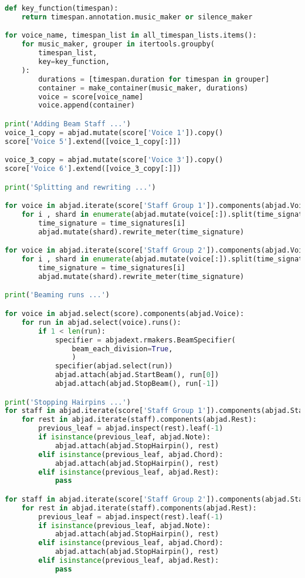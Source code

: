 \begin{lstlisting}[language=Python, caption=Cthar Segment\_I]
def key_function(timespan):
    return timespan.annotation.music_maker or silence_maker

for voice_name, timespan_list in all_timespan_lists.items():
    for music_maker, grouper in itertools.groupby(
        timespan_list,
        key=key_function,
    ):
        durations = [timespan.duration for timespan in grouper]
        container = make_container(music_maker, durations)
        voice = score[voice_name]
        voice.append(container)

print('Adding Beam Staff ...')
voice_1_copy = abjad.mutate(score['Voice 1']).copy()
score['Voice 5'].extend([voice_1_copy[:]])

voice_3_copy = abjad.mutate(score['Voice 3']).copy()
score['Voice 6'].extend([voice_3_copy[:]])

print('Splitting and rewriting ...')

for voice in abjad.iterate(score['Staff Group 1']).components(abjad.Voice):
    for i , shard in enumerate(abjad.mutate(voice[:]).split(time_signatures)):
        time_signature = time_signatures[i]
        abjad.mutate(shard).rewrite_meter(time_signature)

for voice in abjad.iterate(score['Staff Group 2']).components(abjad.Voice):
    for i , shard in enumerate(abjad.mutate(voice[:]).split(time_signatures)):
        time_signature = time_signatures[i]
        abjad.mutate(shard).rewrite_meter(time_signature)

print('Beaming runs ...')

for voice in abjad.select(score).components(abjad.Voice):
    for run in abjad.select(voice).runs():
        if 1 < len(run):
            specifier = abjadext.rmakers.BeamSpecifier(
                beam_each_division=True,
                )
            specifier(abjad.select(run))
            abjad.attach(abjad.StartBeam(), run[0])
            abjad.attach(abjad.StopBeam(), run[-1])

print('Stopping Hairpins ...')
for staff in abjad.iterate(score['Staff Group 1']).components(abjad.Staff):
    for rest in abjad.iterate(staff).components(abjad.Rest):
        previous_leaf = abjad.inspect(rest).leaf(-1)
        if isinstance(previous_leaf, abjad.Note):
            abjad.attach(abjad.StopHairpin(), rest)
        elif isinstance(previous_leaf, abjad.Chord):
            abjad.attach(abjad.StopHairpin(), rest)
        elif isinstance(previous_leaf, abjad.Rest):
            pass

for staff in abjad.iterate(score['Staff Group 2']).components(abjad.Staff):
    for rest in abjad.iterate(staff).components(abjad.Rest):
        previous_leaf = abjad.inspect(rest).leaf(-1)
        if isinstance(previous_leaf, abjad.Note):
            abjad.attach(abjad.StopHairpin(), rest)
        elif isinstance(previous_leaf, abjad.Chord):
            abjad.attach(abjad.StopHairpin(), rest)
        elif isinstance(previous_leaf, abjad.Rest):
            pass



\end{lstlisting}
